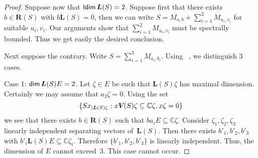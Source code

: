 \documentclass[a4paper,12pt,reqno]{amsart}
\numberwithin{equation}{section}
\theoremstyle{definition}
\begin{document}
\begin{proof}
Suppose now that ${{\sf ldim}\,} {{\bm L(S)}}=2$.  Suppose first that there exists $b \in {{\bm R(S)}}$ with $b {{\bm L(S)}}=0$,
then we can write ${S}= M_{a,b} + \sum_{i=1}^2 M_{u_i,v_i}$ for suitable $u_i, v_i$.
Our arguments show that $\sum_{i=1}^2 M_{u_i,v_i}$ must be spectrally bounded. Thus we get easily the desired conclusion.

Next suppose the contrary. Write $ {S}= \sum_{i=1}^3 M_{a_i,b_i}$.  Using ~\cite{ChSe}, we distinguish 3 cases.

\smallskip\noindent
Case 1: ${{\sf dim}\,} {{\bm L(S)}} E =2$.
Let $\zeta \in E$ be such that ${{\bm L(S)}} \zeta$ has maximal dimension. Certainly we may assume that  $a_3 \zeta=0$. Using the set
\begin{equation*}
\{ Sx_{|{{\bm L(S)}} \zeta}: x {{\bm V\mkern-2.5mu(S)}} \zeta \subseteq {\mathbb{C}} \zeta, x \zeta=0 \}
\end{equation*}
we see that there exists $b \in {{\bm R(S)}}$  such that $ba_i E \subseteq {\mathbb{C}} \zeta$.
Consider $\zeta_1, \zeta_2, \zeta_3$ linearly independent separating vectors of~${{\bm L(S)}}$.
Then there exists $b'_1, b'_2, b'_3$ with $b'_i {{\bm L(S)}} E \subseteq {\mathbb{C}} \zeta_i$.  Therefore $\{b'_1, b'_2, b'_3\}$ is linearly independent.
Thus, the dimension of $E$ cannot exceed~$3$. This case cannot occur.


\end{proof}
\end{document}
